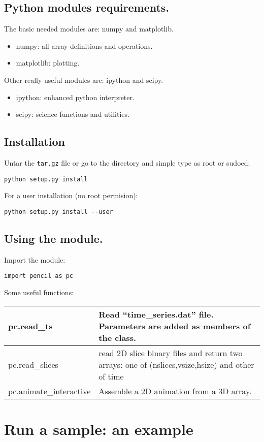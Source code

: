 \documentclass[a4paper,12pt]{article}
\begin{document}
\subsection{Python modules requirements.}
The basic needed modules are: numpy and matplotlib.
\begin{itemize}
 \item numpy: all array definitions and operations.
  \item matplotlib: plotting.
\end{itemize}

Other really useful modules are: ipython and scipy.

\begin{itemize}
 \item ipython: enhanced python interpreter.
  \item scipy: science functions and utilities.
\end{itemize}


\subsection{Installation}
Untar the \texttt{tar.gz} file or go to the directory and simple type as root or sudoed:
\begin{verbatim}
python setup.py install
\end{verbatim}
For a user installation (no root permision):
\begin{verbatim}
python setup.py install --user
\end{verbatim}

\subsection{Using the module.}
Import the module:
\begin{verbatim}
import pencil as pc
\end{verbatim}
Some useful functions:
\begin{center}
\begin{tabular}{|l|l|}\hline
pc.read\_ts & Read ``time\_series.dat'' file. Parameters are added as members of the class. \\\hline
pc.read\_slices & read 2D slice binary files and return two arrays: one of (nslices,vsize,hsize) and other of time\\\hline
pc.animate\_interactive &  Assemble a 2D animation from a 3D array. \\\hline
\end{tabular}
\end{center}

\section{Run a sample: an example}
\end{document}
